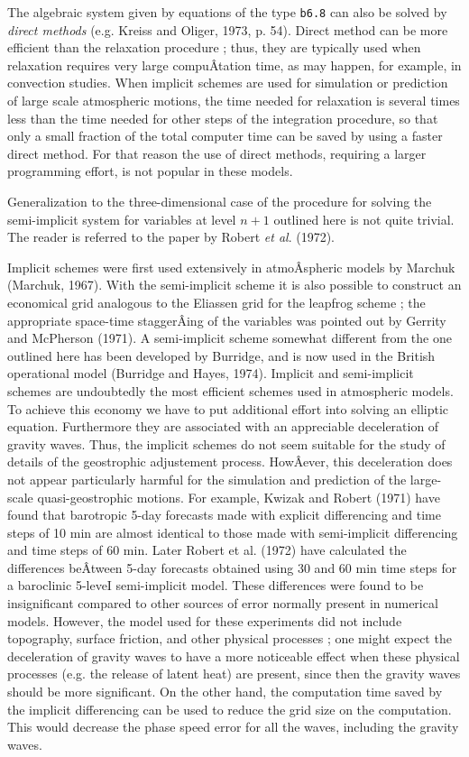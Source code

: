 The algebraic system given by equations of the type \texttt{b6.8} can
also be solved by \emph{direct methods} (e.g. Kreiss and Oliger, 1973,
p. 54). Direct method can be more efficient than the relaxation
procedure ; thus, they are typically used when relaxation requires very
large compuÂ­tation time, as may happen, for example, in convection
studies. When implicit schemes are used for simulation or prediction of
large scale atmospheric motions, the time needed for relaxation is
several times less than the time needed for other steps of the
integration procedure, so that only a small fraction of the total
computer time can be saved by using a faster direct method. For that
reason the use of direct methods, requiring a larger programming effort,
is not popular in these models.

Generalization to the three-dimensional case of the procedure for
solving the semi-implicit system for variables at level \(n + 1\)
outlined here is not quite trivial. The reader is referred to the paper
by Robert \emph{et al}. (1972).

Implicit schemes were first used extensively in atmoÂ­spheric models by
Marchuk (Marchuk, 1967). With the semi-implicit scheme it is also
possible to construct an economical grid analogous to the Eliassen grid
for the leapfrog scheme ; the appropriate space-time staggerÂ­ing of the
variables was pointed out by Gerrity and McPherson (1971). A
semi-implicit scheme somewhat different from the one outlined here has
been developed by Burridge, and is now used in the British operational
model (Burridge and Hayes, 1974). Implicit and semi-implicit schemes are
undoubtedly the most efficient schemes used in atmospheric models. To
achieve this economy we have to put additional effort into solving an
elliptic equation. Furthermore they are associated with an appreciable
deceleration of gravity waves. Thus, the implicit schemes do not seem
suitable for the study of details of the geostrophic adjustement
process. HowÂ­ever, this deceleration does not appear particularly
harmful for the simulation and prediction of the large-scale
quasi-geostrophic motions. For example, Kwizak and Robert (1971) have
found that barotropic 5-day forecasts made with explicit differencing
and time steps of 10 min are almost identical to those made with
semi-implicit differencing and time steps of 60 min. Later Robert et al.
(1972) have calculated the differences beÂ­tween 5-day forecasts obtained
using 30 and 60 min time steps for a baroclinic 5-leveI semi-implicit
model. These differences were found to be insignificant compared to
other sources of error normally present in numerical models. However,
the model used for these experiments did not include topography, surface
friction, and other physical processes ; one might expect the
deceleration of gravity waves to have a more noticeable effect when
these physical processes (e.g. the release of latent heat) are present,
since then the gravity waves should be more significant. On the other
hand, the computation time saved by the implicit differencing can be
used to reduce the grid size on the computation. This would decrease the
phase speed error for all the waves, including the gravity waves.


